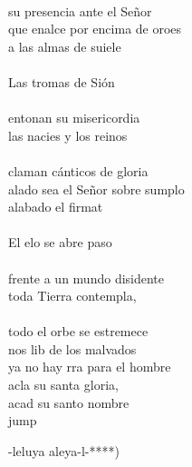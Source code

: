 \begin{cancion}
	\jump\\
su presencia ante el Señor\\
	que enalce por encima de oroes\\
	a las almas de suiele\\
	\jump\\
	Las tromas de Sión \\
	\jump\\
entonan su misericordia\\
	las nacies y los reinos \\
	\jump\\
claman cánticos de gloria\\
	alado sea el Señor sobre sumplo\\
	alabado el firmat\\
	\jump\\
	El elo se abre paso \\
	\jump\\
frente a un mundo disidente\\
	toda  Tierra contempla, \\
	\jump\\
todo el orbe se estremece\\
	nos lib de los malvados  \\
	ya no hay rra para el hombre\\
	acla su santa gloria,\\
	 acad su santo nombre\\jump\\
	\begin{chorus}%
	-leluya aleya-l-*)\\
	\end{chorus}%
	\jump\\
\end{cancion}%
